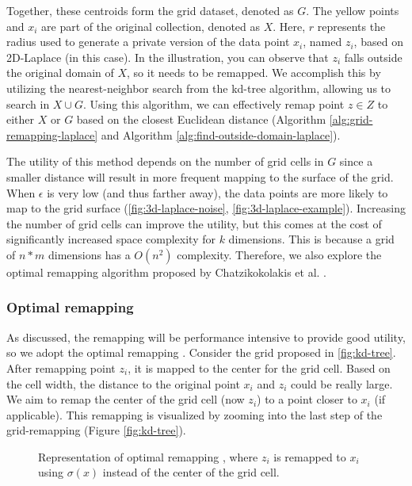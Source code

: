 Together, these centroids form the grid dataset, denoted as $G$.
The yellow points and $x_i$ are part of the original collection, denoted as $X$.
Here, $r$ represents the radius used to generate a private version of the data point $x_i$, named $z_i$, based on 2D-Laplace (in this case).
In the illustration, you can observe that $z_i$ falls outside the original domain of $X$, so it needs to be remapped.
We accomplish this by utilizing the nearest-neighbor search from the kd-tree algorithm, allowing us to search in $X \cup G$.
Using this algorithm, we can effectively remap point $z \in Z$ to either $X$ or $G$ based on the closest Euclidean distance (Algorithm \ref{alg:grid-remapping-laplace} and Algorithm \ref{alg:find-outside-domain-laplace}).

The utility of this method depends on the number of grid cells in $G$ since a smaller distance will result in more frequent mapping to the surface of the grid.
When $\epsilon$ is very low (and thus farther away), the data points are more likely to map to the grid surface (\ref{fig:3d-laplace-noise}, \ref{fig:3d-laplace-example}).
Increasing the number of grid cells can improve the utility, but this comes at the cost of significantly increased space complexity for $k$ dimensions.
This is because a grid of $n*m$ dimensions has a $O(n^2)$ complexity.
Therefore, we also explore the optimal remapping algorithm proposed by Chatzikokolakis et al. \citep{chatzikokolakis_efficient_2017}.



\newpage
\subsubsection{Optimal remapping} \label{theory:optimal-remapping}
As discussed, the remapping will be performance intensive to provide good utility, so we adopt the optimal remapping \citep{chatzikokolakis_efficient_2017}.
Consider the grid proposed in \ref{fig:kd-tree}.
After remapping point $z_i$, it is mapped to the center for the grid cell.
Based on the cell width, the distance to the original point $x_i$ and $ z_i$ could be really large.
We aim to remap the center of the grid cell (now $z_i$) to a point closer to $x_i$ (if applicable). \newline
This remapping is visualized by zooming into the last step of the grid-remapping (Figure \ref{fig:kd-tree}).
\begin{figure}[H]
  
  \caption{Representation of optimal remapping \citep{chatzikokolakis_efficient_2017}, where $z_i$ is remapped to $x_i$ using $\sigma(x)$ instead of the center of the grid cell.}
  \label{fig:optimal-remapping}
\end{figure}

